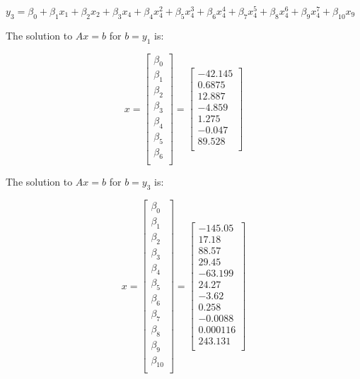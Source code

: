 \documentclass[
]{article}
\begin{document}
\(y_{3} = \beta_{0} + \beta_{1}x_{1} + \beta_{2}x_{2} + \beta_{3}x_{4} + \beta_{4}x_{4}^{2} + \beta_{5}x_{4}^{3} + \beta_{6}x_{4}^{4} + \beta_{7}x_{4}^{5} + \beta_{8}x_{4}^{6} + \beta_{9}x_{4}^{7} + \beta_{10}x_{9}\)

The solution to \(Ax = b\) for \(b = y_{1}\) is:

\[
x =
  \begin{bmatrix}
    \beta_{0} \\
     \beta_{1} \\
    \beta_{2} \\
     \beta_{3}\\
     \beta_{4} \\
    \beta_{5} \\
    \beta_{6} \\
  \end{bmatrix} =
  \begin{bmatrix}
    -42.145 \\
    0.6875 \\
    12.887 \\
    -4.859 \\
    1.275 \\
    -0.047 \\
    89.528 \\
  \end{bmatrix}
\]

The solution to \(Ax = b\) for \(b = y_{3}\) is:

\[
x =
  \begin{bmatrix}
    \beta_{0} \\
     \beta_{1} \\
    \beta_{2} \\
     \beta_{3}\\
     \beta_{4} \\
    \beta_{5} \\
    \beta_{6} \\
    \beta_{7}\\
     \beta_{8} \\
    \beta_{9} \\
    \beta_{10} \\
  \end{bmatrix} =
  \begin{bmatrix}
    -145.05 \\
    17.18 \\
    88.57 \\
    29.45 \\
    -63.199 \\
    24.27 \\
    -3.62 \\
    0.258 \\
    -0.0088 \\
    0.000116 \\
    243.131 \\
  \end{bmatrix} 
\]
\end{document}
